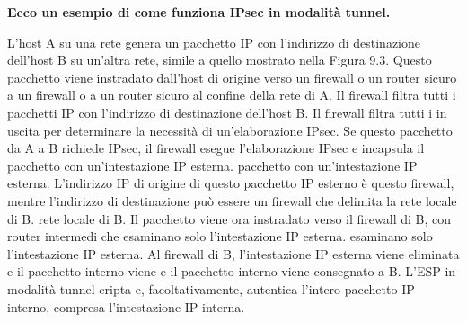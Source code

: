 \singlespacing

\textbf{Ecco un esempio di come funziona IPsec in modalità tunnel.}

\singlespacing

L'host A su una rete genera un pacchetto IP con l'indirizzo di destinazione dell'host B su un'altra rete, simile a quello mostrato nella Figura 9.3. Questo pacchetto viene instradato dall'host di origine verso un firewall o un router sicuro a un firewall o a un router sicuro al confine della rete di A. Il firewall filtra tutti i pacchetti IP con l'indirizzo di destinazione dell'host B. Il firewall filtra tutti i in uscita per determinare la necessità di un'elaborazione IPsec. Se questo pacchetto da A a B richiede IPsec, il firewall esegue l'elaborazione IPsec e incapsula il pacchetto con un'intestazione IP esterna. pacchetto con un'intestazione IP esterna. L'indirizzo IP di origine di questo pacchetto IP esterno è questo firewall, mentre l'indirizzo di destinazione può essere un firewall che delimita la rete locale di B. rete locale di B. Il pacchetto viene ora instradato verso il firewall di B, con router intermedi che esaminano solo l'intestazione IP esterna. esaminano solo l'intestazione IP esterna. Al firewall di B, l'intestazione IP esterna viene eliminata e il pacchetto interno viene e il pacchetto interno viene consegnato a B. L'ESP in modalità tunnel cripta e, facoltativamente, autentica l'intero pacchetto IP interno, compresa l'intestazione IP interna.

